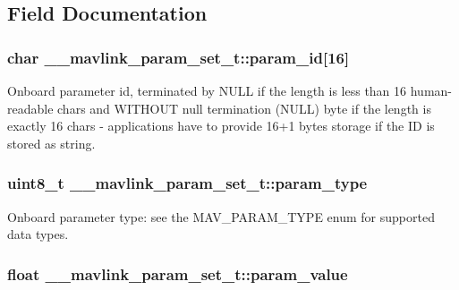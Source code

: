 \subsection{Field Documentation}
\hypertarget{struct____mavlink__param__set__t_acfcba135c2e917f0fcf3527bf2354477}{
\subsubsection[{param\+\_\+id}]{\setlength{\rightskip}{0pt plus 5cm}char \+\_\+\+\_\+mavlink\+\_\+param\+\_\+set\+\_\+t\+::param\+\_\+id\mbox{[}16\mbox{]}}}\label{struct____mavlink__param__set__t_acfcba135c2e917f0fcf3527bf2354477}


Onboard parameter id, terminated by N\+U\+L\+L if the length is less than 16 human-\/readable chars and W\+I\+T\+H\+O\+U\+T null termination (N\+U\+L\+L) byte if the length is exactly 16 chars -\/ applications have to provide 16+1 bytes storage if the I\+D is stored as string. 

\hypertarget{struct____mavlink__param__set__t_a4eb99cce0725481254d653290a06de6f}{
\subsubsection[{param\+\_\+type}]{\setlength{\rightskip}{0pt plus 5cm}uint8\+\_\+t \+\_\+\+\_\+mavlink\+\_\+param\+\_\+set\+\_\+t\+::param\+\_\+type}}\label{struct____mavlink__param__set__t_a4eb99cce0725481254d653290a06de6f}


Onboard parameter type\+: see the M\+A\+V\+\_\+\+P\+A\+R\+A\+M\+\_\+\+T\+Y\+P\+E enum for supported data types. 

\hypertarget{struct____mavlink__param__set__t_a210adccaf668137e5f083c825804276e}{
\subsubsection[{param\+\_\+value}]{\setlength{\rightskip}{0pt plus 5cm}float \+\_\+\+\_\+mavlink\+\_\+param\+\_\+set\+\_\+t\+::param\+\_\+value}}\label{struct____mavlink__param__set__t_a210adccaf668137e5f083c825804276e}


